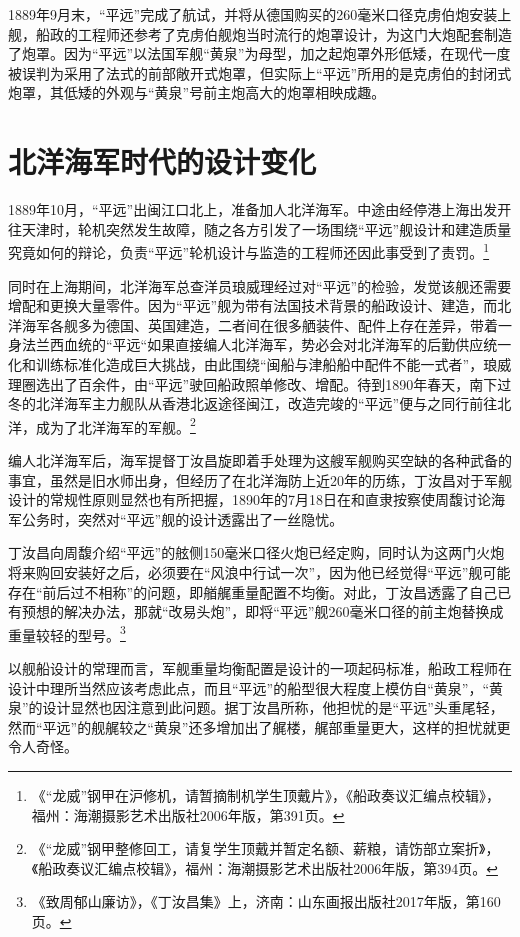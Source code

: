 \documentclass[12pt,UTF8]{ctexbook}
\begin{document}
1889年9月末，“平远”完成了航试，并将从德国购买的260毫米口径克虏伯炮安装上舰，船政的工程师还参考了克虏伯舰炮当时流行的炮罩设计，为这门大炮配套制造了炮罩。因为“平远”以法国军舰“黄泉”为母型，加之起炮罩外形低矮，在现代一度被误判为采用了法式的前部敞开式炮罩，但实际上“平远”所用的是克虏伯的封闭式炮罩，其低矮的外观与“黄泉”号前主炮高大的炮罩相映成趣。

\section{北洋海军时代的设计变化}

1889年10月，“平远”出闽江口北上，准备加人北洋海军。中途由经停港上海出发开往天津时，轮机突然发生故障，随之各方引发了一场围绕“平远”舰设计和建造质量究竟如何的辩论，负责“平远”轮机设计与监造的工程师还因此事受到了责罚。\footnote{《“龙威”钢甲在沪修机，请暂摘制机学生顶戴片》，《船政奏议汇编点校辑》，福州：海潮摄影艺术出版社2006年版，第391页。}

同时在上海期间，北洋海军总查洋员琅威理经过对“平远”的检验，发觉该舰还需要增配和更换大量零件。因为“平远”舰为带有法国技术背景的船政设计、建造，而北洋海军各舰多为德国、英国建造，二者间在很多舾装件、配件上存在差异，带着一身法兰西血统的“平远“如果直接编人北洋海军，势必会对北洋海军的后勤供应统一化和训练标准化造成巨大挑战，由此围绕“闽船与津船船中配件不能一式者”，琅威理圈选出了百余件，由“平远”驶回船政照单修改、增配。待到1890年春天，南下过冬的北洋海军主力舰队从香港北返途径闽江，改造完竣的“平远”便与之同行前往北洋，成为了北洋海军的军舰。\footnote{《“龙威”钢甲整修回工，请复学生顶戴并暂定名额、薪粮，请饬部立案折》，《船政奏议汇编点校辑》，福州：海潮摄影艺术出版社2006年版，第394页。}

编人北洋海军后，海军提督丁汝昌旋即着手处理为这艘军舰购买空缺的各种武备的事宜，虽然是旧水师出身，但经历了在北洋海防上近20年的历练，丁汝昌对于军舰设计的常规性原则显然也有所把握，1890年的7月18日在和直隶按察使周馥讨论海军公务时，突然对“平远”舰的设计透露出了一丝隐忧。

丁汝昌向周馥介绍“平远”的舷侧150毫米口径火炮已经定购，同时认为这两门火炮将来购回安装好之后，必须要在“风浪中行试一次”，因为他已经觉得“平远”舰可能存在“前后过不相称”的问题，即艏艉重量配置不均衡。对此，丁汝昌透露了自己已有预想的解决办法，那就“改易头炮”，即将“平远”舰260毫米口径的前主炮替换成重量较轻的型号。\footnote{《致周郁山廉访》，《丁汝昌集》上，济南：山东画报出版社2017年版，第160页。}

以舰船设计的常理而言，军舰重量均衡配置是设计的一项起码标准，船政工程师在设计中理所当然应该考虑此点，而且“平远”的船型很大程度上模仿自“黄泉”，“黄泉”的设计显然也因注意到此问题。据丁汝昌所称，他担忧的是“平远”头重尾轻，然而“平远”的舰艉较之“黄泉”还多增加出了艉楼，艉部重量更大，这样的担忧就更令人奇怪。
\end{document}
